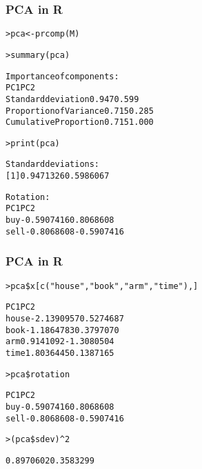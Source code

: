 \begin{frame}[fragile]
  \frametitle{PCA in R}
  
  \ungap
\begin{alltt}\small
> pca <- prcomp(M)  

> summary(pca) \begin{Rout}
Importance of components:
                         PC1   PC2
Standard deviation     0.947 0.599
Proportion of Variance 0.715 0.285
Cumulative Proportion  0.715 1.000 \end{Rout}

> print(pca) \begin{Rout}
Standard deviations:
[1] 0.9471326 0.5986067

Rotation:
            PC1        PC2
buy  -0.5907416  0.8068608
sell -0.8068608 -0.5907416 \end{Rout}
\end{alltt}
\end{frame}

\begin{frame}[fragile]
  \frametitle{PCA in R}
  
  \ungap
\begin{alltt}\small
{}
> pca\$x[c("house","book","arm","time"), ] \begin{Rout}
             PC1        PC2
house -2.1390957  0.5274687
book  -1.1864783  0.3797070
arm    0.9141092 -1.3080504
time   1.8036445  0.1387165 \end{Rout}

> pca\$rotation \begin{Rout}
            PC1        PC2
buy  -0.5907416  0.8068608
sell -0.8068608 -0.5907416 \end{Rout}

> (pca\$sdev)^2 \begin{Rout}
[1] 0.8970602 0.3583299 \end{Rout}
\end{alltt}
\end{frame}

